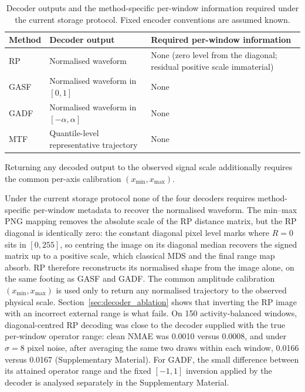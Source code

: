 \documentclass[5p]{elsarticle}
\begin{document}
\begin{table}[!htbp]
\centering
\caption{Decoder outputs and the method-specific per-window information required under the current storage protocol. Fixed encoder conventions are assumed known.}\label{tab:decoder_contract}
\small
\setlength{\tabcolsep}{6pt}
\begin{tabular}{@{}L{0.12\textwidth}L{0.38\textwidth}L{0.40\textwidth}@{}}
\toprule
Method & Decoder output & Required per-window information \\
\midrule
RP   & Normalised waveform & None (zero level from the diagonal; residual positive scale immaterial) \\
GASF & Normalised waveform in $[0,1]$ & None \\
GADF & Normalised waveform in $[-\alpha,\alpha]$ & None \\
MTF  & Quantile-level representative trajectory & None \\
\bottomrule
\end{tabular}

\smallskip
\footnotesize
 Returning any decoded output to the observed signal scale additionally requires the common per-axis calibration $(x_{\min},x_{\max})$.
\end{table}

Under the current storage protocol none of the four decoders requires method-specific per-window metadata to recover the normalised waveform. The min--max PNG mapping removes the absolute scale of the RP distance matrix, but the RP diagonal is identically zero: the constant diagonal pixel level marks where \(R=0\) sits in \([0,255]\), so centring the image on its diagonal median recovers the signed matrix up to a positive scale, which classical MDS and the final range map absorb. RP therefore reconstructs its normalised shape from the image alone, on the same footing as GASF and GADF\@. The common amplitude calibration \((x_{\min},x_{\max})\) is used only to return any normalised trajectory to the observed physical scale. Section~\ref{sec:decoder_ablation} shows that inverting the RP image with an incorrect external range is what fails. On 150 activity-balanced windows, diagonal-centred RP decoding was close to the decoder supplied with the true per-window operator range: clean NMAE was 0.0010 versus 0.0008, and under \(\sigma=8\) pixel noise, after averaging the same two draws within each window, 0.0166 versus 0.0167 (Supplementary Material). For GADF, the small difference between its attained operator range and the fixed \([-1,1]\) inversion applied by the decoder is analysed separately in the Supplementary Material.
\end{document}
